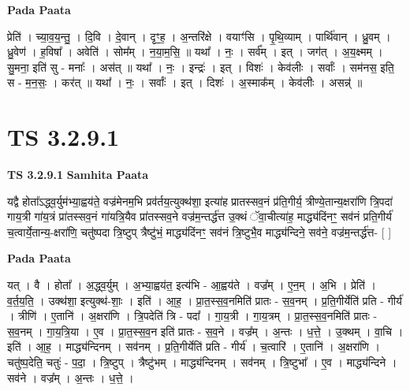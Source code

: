 \documentclass[17pt]{extarticle}
\begin{document}
\textbf{Pada Paata} \newline

प्रेति॑ । च्या॒व॒य॒न्तु॒ । दि॒वि । दे॒वान् । दृꣳ॒॒ह॒ । अ॒न्तरि॑क्षे । वयाꣳ॑सि । पृ॒थि॒व्याम् । पार्थि॑वान् । ध्रु॒वम् । ध्रु॒वेण॑ । ह॒विषा᳚ । अवेति॑ । सोम᳚म् । न॒या॒म॒सि॒ ॥ यथा᳚ । नः॒ । सर्व᳚म् । इत् । जग॑त् । अ॒य॒क्ष्मम् । सु॒मना॒ इति॑ सु - मनाः᳚ । अस॑त् ॥ यथा᳚ । नः॒ । इन्द्रः॑ । इत् । विशः॑ । केव॑लीः । सर्वाः᳚ । सम॑नस॒ इति॒ स - म॒न॒सः॒ । कर॑त् ॥ यथा᳚ । नः॒ । सर्वाः᳚ । इत् । दिशः॑ । अ॒स्माक᳚म् । केव॑लीः । असन्न्॑ ॥  \newline





\section{ TS 3.2.9.1 }

\textbf{TS 3.2.9.1 } \newline
\textbf{Samhita Paata} \newline

यद्वै होता᳚ऽद्ध्व॒र्युम॑भ्या॒ह्वय॑ते॒ वज्र॑मेनम॒भि प्रव॑र्तय॒त्युक्थ॑शा॒ इत्या॑ह प्रातस्सव॒नं प्र॑ति॒गीर्य॒ त्रीण्ये॒तान्य॒क्षरा॑णि त्रि॒पदा॑ गाय॒त्री गा॑य॒त्रं प्रा॑तस्सव॒नं गा॑यत्रि॒यैव प्रा॑तस्सव॒ने वज्र॑म॒न्तर्द्ध॑त्त उ॒क्थं ॅवा॒चीत्या॑ह॒ माद्ध्य॑दिंनꣳ॒॒ सव॑नं प्रति॒गीर्य॑ च॒त्वार्ये॒तान्य॒-क्षरा॑णि॒ चतु॑ष्पदा त्रि॒ष्टुप् त्रैष्टु॑भं॒ माद्ध्य॑दिंनꣳ॒॒ सव॑नं त्रि॒ष्टुभै॒व माद्ध्य॑न्दिने॒ सव॑ने॒ वज्र॑म॒न्तर्द्ध॑त्त-  [  ] \newline

\textbf{Pada Paata} \newline

यत् । वै । होता᳚ । अ॒द्ध्व॒र्युम् । अ॒भ्या॒ह्वय॑त॒ इत्य॑भि - आ॒ह्वय॑ते । वज्र᳚म् । ए॒न॒म् । अ॒भि । प्रेति॑ । व॒र्त॒य॒ति॒ । उक्थ॑शा॒ इत्युक्थ॑-शाः॒ । इति॑ । आ॒ह॒ । प्रा॒त॒स्स॒व॒नमिति॑ प्रातः - स॒व॒नम् । प्र॒ति॒गीर्येति॑ प्रति - गीर्य॑ । त्रीणि॑ । ए॒तानि॑ । अ॒क्षरा॑णि । त्रि॒पदेति॑ त्रि - पदा᳚ । गा॒य॒त्री । गा॒य॒त्रम् । प्रा॒त॒स्स॒व॒नमिति॑ प्रातः - स॒व॒नम् । गा॒य॒त्रि॒या । ए॒व । प्रा॒त॒स्स॒व॒न इति॑ प्रातः - स॒व॒ने । वज्र᳚म् । अ॒न्तः । ध॒त्ते॒ । उ॒क्थम् । वा॒चि । इति॑ । आ॒ह॒ । माद्ध्य॑न्दिनम् । सव॑नम् । प्र॒ति॒गीर्येति॑ प्रति - गीर्य॑ । च॒त्वारि॑ । ए॒तानि॑ । अ॒क्षरा॑णि । चतु॑ष्प॒देति॒ चतुः॑ - प॒दा॒ । त्रि॒ष्टुप् । त्रैष्टु॑भम् । माद्ध्य॑न्दिनम् । सव॑नम् । त्रि॒ष्टुभा᳚ । ए॒व । माद्ध्य॑न्दिने । सव॑ने । वज्र᳚म् । अ॒न्तः । ध॒त्ते॒ ।  \newline
\end{document}
